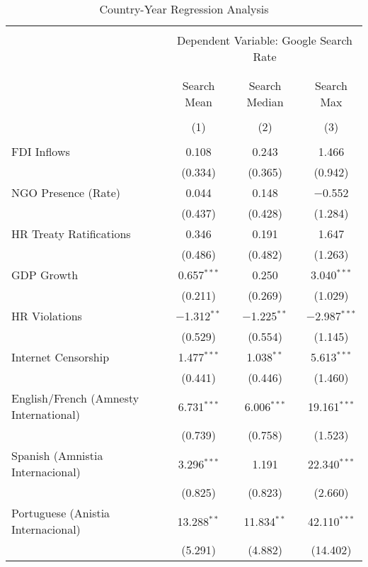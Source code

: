 
\begin{table}[!htbp] \centering 
  \caption{Country-Year Regression Analysis} 
  \label{} 
\begin{tabular}{@{\extracolsep{5pt}}lccc} 
\\[-1.8ex]\hline 
\hline \\[-1.8ex] 
 & \multicolumn{3}{c}{Dependent Variable: Google Search Rate} \\ 
\cline{2-4} 
\\[-1.8ex] & \multicolumn{3}{c}{ } \\ 
 & Search Mean & Search Median & Search Max \\ 
\\[-1.8ex] & (1) & (2) & (3)\\ 
\hline \\[-1.8ex] 
 FDI Inflows & 0.108 & 0.243 & 1.466 \\ 
  & (0.334) & (0.365) & (0.942) \\ 
  NGO Presence (Rate) & 0.044 & 0.148 & $-$0.552 \\ 
  & (0.437) & (0.428) & (1.284) \\ 
  HR Treaty Ratifications & 0.346 & 0.191 & 1.647 \\ 
  & (0.486) & (0.482) & (1.263) \\ 
  GDP Growth & 0.657$^{***}$ & 0.250 & 3.040$^{***}$ \\ 
  & (0.211) & (0.269) & (1.029) \\ 
  HR Violations & $-$1.312$^{**}$ & $-$1.225$^{**}$ & $-$2.987$^{***}$ \\ 
  & (0.529) & (0.554) & (1.145) \\ 
  Internet Censorship & 1.477$^{***}$ & 1.038$^{**}$ & 5.613$^{***}$ \\ 
  & (0.441) & (0.446) & (1.460) \\ 
  English/French (Amnesty International) & 6.731$^{***}$ & 6.006$^{***}$ & 19.161$^{***}$ \\ 
  & (0.739) & (0.758) & (1.523) \\ 
  Spanish (Amnistia Internacional) & 3.296$^{***}$ & 1.191 & 22.340$^{***}$ \\ 
  & (0.825) & (0.823) & (2.660) \\ 
  Portuguese (Anistia Internacional) & 13.288$^{**}$ & 11.834$^{**}$ & 42.110$^{***}$ \\ 
  & (5.291) & (4.882) & (14.402) \\ 

\end{tabular}
\end{table}
